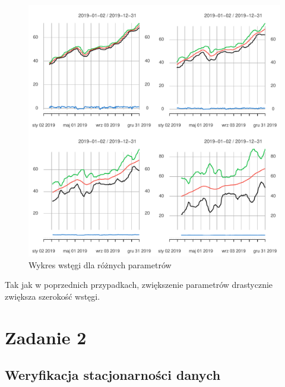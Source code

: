 \documentclass[12pt, a4paper]{article}\usepackage[]{graphicx}\usepackage[]{color}
\makeatletter
\def\maxwidth{ %
  \ifdim\Gin@nat@width>\linewidth
    \linewidth
  \else
    \Gin@nat@width
  \fi
}
\newenvironment{knitrout}{}{} %
\makeatother
\begin{document}
\begin{knitrout}
\color{fgcolor}\begin{figure}[H]

{\centering \includegraphics[width=\maxwidth]{figure/unnamed-chunk-8-1} 

}

\caption[Wykres wstęgi dla różnych parametrów]{Wykres wstęgi dla różnych parametrów}\label{fig:unnamed-chunk-8}
\end{figure}

\end{knitrout}

Tak jak w poprzednich przypadkach, zwiększenie parametrów drastycznie zwiększa szerokość wstęgi.

\section{Zadanie 2}

\subsection{Weryfikacja stacjonarności danych}
\end{document}
